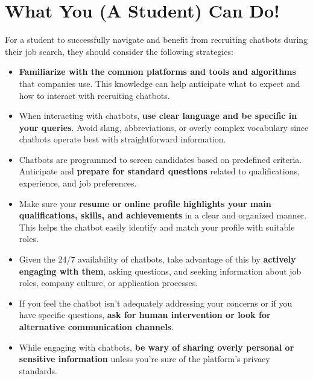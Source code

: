 \documentclass[
]{book}
\providecommand{\tightlist}{%
  \setlength{\itemsep}{0pt}\setlength{\parskip}{0pt}}
\begin{document}
\hypertarget{what-you-a-student-can-do}{%
\section{What You (A Student) Can Do!}\label{what-you-a-student-can-do}}

For a student to successfully navigate and benefit from recruiting chatbots during their job search, they should consider the following strategies:

\begin{itemize}
\tightlist
\item
  \textbf{Familiarize with the common platforms and tools and algorithms} that companies use. This knowledge can help anticipate what to expect and how to interact with recruiting chatbots.
\end{itemize}

\begin{itemize}
\tightlist
\item
  When interacting with chatbots, \textbf{use clear language and be specific in your queries}. Avoid slang, abbreviations, or overly complex vocabulary since chatbots operate best with straightforward information.
\end{itemize}

\begin{itemize}
\tightlist
\item
  Chatbots are programmed to screen candidates based on predefined criteria. Anticipate and \textbf{prepare for standard questions} related to qualifications, experience, and job preferences.
\end{itemize}

\begin{itemize}
\tightlist
\item
  Make sure your \textbf{resume or online profile highlights your main qualifications, skills, and achievements} in a clear and organized manner. This helps the chatbot easily identify and match your profile with suitable roles.
\end{itemize}

\begin{itemize}
\tightlist
\item
  Given the 24/7 availability of chatbots, take advantage of this by \textbf{actively engaging with them}, asking questions, and seeking information about job roles, company culture, or application processes.
\end{itemize}

\begin{itemize}
\item
  If you feel the chatbot isn't adequately addressing your concerns or if you have specific questions, \textbf{ask for human intervention or look for alternative communication channels}.
\item
  While engaging with chatbots, \textbf{be wary of sharing overly personal or sensitive information} unless you're sure of the platform's privacy standards.
\end{itemize}
\end{document}
